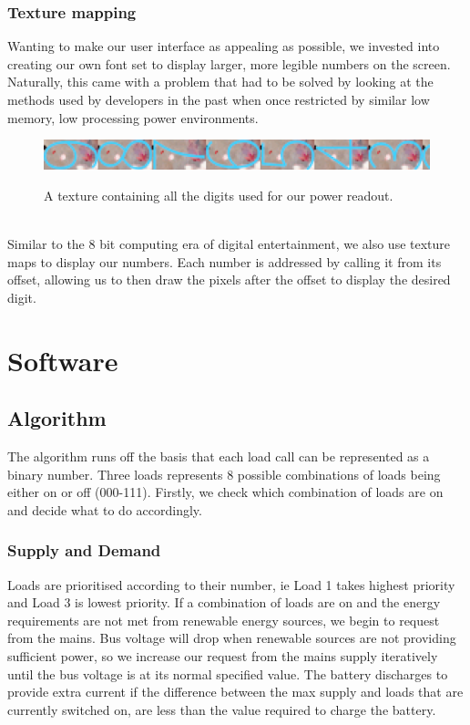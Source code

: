 \documentclass[9pt, technote, a4paper, nofonttune]{IEEEphot}
\begin{document}
      \subsubsection{Texture mapping}
      \hspace{0.5cm}Wanting to make our user interface as appealing as possible, we invested into creating our own font set to display larger, more legible numbers on the screen.  Naturally, this came with a problem that had to be solved by looking at the methods used by developers in the past when once restricted by similar low memory, low processing power environments.
        \begin{figure}[h]
        \centering
        \includegraphics[width=35pc]{D5/digit2.png}
        \label{fig_env1}
        \caption{A texture containing all the digits used for our power readout.}
        \end{figure}
        \\
    \hspace{0.5cm}Similar to the 8 bit computing era of digital entertainment, we also use texture maps to display our numbers.  Each number is addressed by calling it from its offset, allowing us to then draw the pixels after the offset to display the desired digit.
        

\newpage
\section{Software}
        \subsection{Algorithm}
        The algorithm runs off the basis that each load call can be represented as a binary number. Three loads represents 8 possible combinations of loads being either on or off (000-111). Firstly, we check which combination of loads are on and decide what to do accordingly.
        \subsubsection{Supply and Demand}
       Loads are prioritised according to their number, ie Load 1 takes highest priority and Load 3 is lowest priority. 
       If a combination of loads are on and the energy requirements are not met from renewable energy sources, we begin to request from the mains. Bus voltage will drop when renewable sources are not providing sufficient power, so we increase our request from the mains supply iteratively until the bus voltage is at its normal specified value. The battery discharges to provide extra current if the difference between the max supply and  loads that are currently switched on, are less than the value required to charge the battery.
\end{document}
